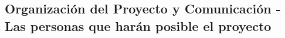 \subsection{Organización del Proyecto y Comunicación - Las personas que harán posible el proyecto}\label{sec:spmp-8-4}


